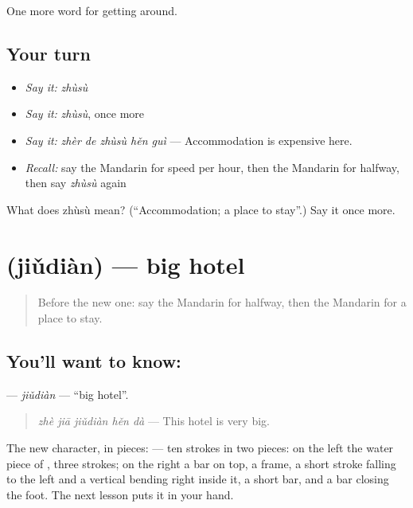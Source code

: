 \begin{grammarlens}[title={What you've built}]
One more word for getting around.
\end{grammarlens}

\subsection*{Your turn}
\begin{itemize}
\raggedright
  \item \emph{Say it:} \emph{zhùsù}
  \item \emph{Say it:} \emph{zhùsù}, once more
  \item \emph{Say it:} \emph{zhèr de zhùsù hěn guì} — Accommodation is expensive here.
  \item \emph{Recall:} say the Mandarin for speed per hour, then the Mandarin for halfway, then say \emph{zhùsù} again
\end{itemize}

\begin{tcolorbox}[breakable,colback=teal!4,colframe=teal!35!black,title={Before you move on}]
What does zhùsù mean? (\textquotedblleft{}Accommodation; a place to stay\textquotedblright{}.) Say it once more.
\end{tcolorbox}
\section[\texorpdfstring{\zh{酒店} (jiǔdiàn)}{酒店 (jiǔdiàn)}]{ (jiǔdiàn) — big hotel}

\label{lesson:ZH-C425-jiudian}



\begin{quote}
Before the new one: say the Mandarin for halfway, then the Mandarin for a place to stay.
\end{quote}

\subsection*{You'll want to know: }
\textbf{} — \emph{jiǔdiàn} — \textquotedblleft{}big hotel\textquotedblright{}.

\begin{quote}
\textbf{} \emph{zhè jiā jiǔdiàn hěn dà} — This hotel is very big.
\end{quote}

The new character, in pieces:  — ten strokes in two pieces: on the left the water piece of , three strokes; on the right a bar on top, a frame, a short stroke falling to the left and a vertical bending right inside it, a short bar, and a bar closing the foot. The next lesson puts it in your hand.

